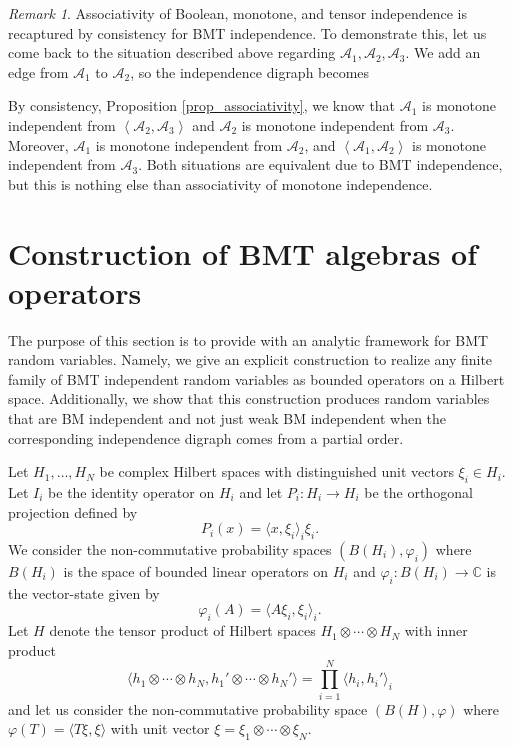 \documentclass[a4paper,12pt]{extarticle}
\theoremstyle{definition}
\theoremstyle{remark}
\newtheorem{rem}[thm]{Remark}
\begin{document}
\begin{rem}
%
Associativity of Boolean, monotone, and tensor independence is recaptured by consistency for BMT independence.
%
To demonstrate this, let us come back to the situation described above regarding  $\mathcal{A}_1, \mathcal{A}_2, \mathcal{A}_3$. 
%
We add an edge from  $\mathcal{A}_1$ to $\mathcal{A}_2$, so the independence digraph becomes 
\begin{center}
\end{center} 
By consistency, Proposition \ref{prop_associativity}, we know that $\mathcal{A}_1$ is monotone independent from $\left< \mathcal{A}_2, \mathcal{A}_3\right>$ and $\mathcal{A}_2$  is monotone independent from $\mathcal{A}_3$. 
%
Moreover, $\mathcal{A}_1$  is monotone independent from $\mathcal{A}_2$,  
and $\left< \mathcal{A}_1, \mathcal{A}_2\right>$ is monotone independent from $\mathcal{A}_3$. 
%
Both situations are equivalent due to BMT independence, but this is nothing else than associativity of monotone independence. 
%
\end{rem}




\section{Construction of BMT algebras of operators }
%
The purpose of this section is to provide with an analytic framework for BMT random variables. 
%
Namely, we give an explicit construction to realize any finite family of BMT independent random variables as bounded operators on a Hilbert space. 
%
Additionally, we show that this construction produces random variables that are BM independent and not just weak BM independent when the corresponding independence digraph comes from a partial order. 


Let $H_1,\ldots, H_N$ be complex Hilbert spaces with distinguished unit vectors $\xi_i\in H_i$. 
%
Let $I_i$ be the identity operator on $H_i$ and let $P_i:H_i\to H_i$ be the orthogonal projection defined by 
%
\[ P_i(x)=\langle x,\xi_i \rangle_i \xi_i. \]
%
We consider the non-commutative probability spaces $(B(H_i),\varphi_i)$ where $B(H_i)$ is the space of bounded linear operators on $H_i$ and $\varphi_i:B(H_i)\to \mathbb{C}$ is the vector-state given by
%
\[\varphi_i(A)=\langle A\xi_i,\xi_i \rangle_i. \]
%
Let $H$ denote the tensor product of Hilbert spaces $H_1\otimes \cdots \otimes H_N$ with inner product 
%
\[\langle h_1\otimes \cdots \otimes h_N,h_1'\otimes \cdots \otimes h_N' \rangle=\prod_{i=1}^N \langle h_i,h_i'\rangle_i \]
%
and let us consider the non-commutative probability space $(B(H),\varphi)$ where $\varphi(T)=\langle T\xi,\xi\rangle$ with unit vector $\xi=\xi_1\otimes \cdots \otimes \xi_N$. 
\end{document}
